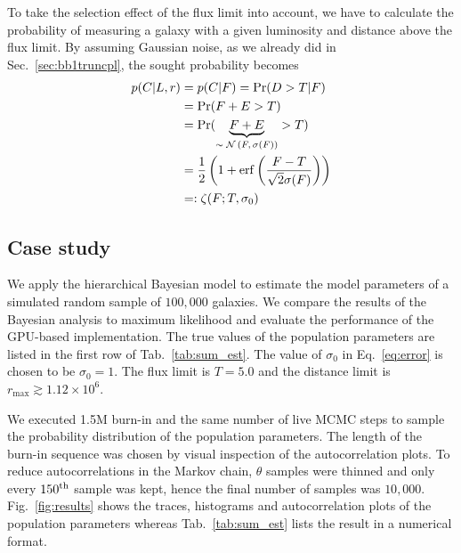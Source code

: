 To take the selection effect of the flux limit into account, we have to calculate the probability of measuring a galaxy with a given luminosity and distance above the flux limit.
By assuming Gaussian noise, as we already did in Sec.~\ref{sec:bb1truncpl}, the sought probability becomes
\begin{align}
p(C | L, r) &= p(C | F) = \Pr(D>T | F)\\
&= \Pr(F+E>T)\\
&=\Pr(\underbrace{F + E}_\text{$\sim \mathcal{N}\left(F,\sigma(F)\right)$} > T)\\
&=\frac{1}{2}\left( 1 + \operatorname{erf}\left( \frac{F - T}{\sqrt{2}\sigma(F)} \right) \right)\\
&=:\zeta(F ; T,\sigma_0)
\label{eq:pclr}
\end{align}



\subsection{Case study}


We apply the hierarchical Bayesian model to estimate the model parameters of a simulated random sample of $100{,}000$ galaxies.
We compare the results of the Bayesian analysis to maximum likelihood and evaluate the performance of the GPU-based implementation.
The true values of the population parameters are listed in the first row of Tab.~\ref{tab:sum_est}.
The value of $\sigma_0$ in Eq.~\ref{eq:error} is chosen to be $\sigma_0=1$.
The flux limit is $T = 5.0$ and the distance limit is $r_{\max} \gtrsim 1.12 \times 10^{6}$.

We executed 1.5M burn-in and the same number of live MCMC steps to sample the probability distribution of the population parameters.
The length of the burn-in sequence was chosen by visual inspection of the autocorrelation plots.
To reduce autocorrelations in the Markov chain, $\theta$ samples were thinned and only every $150^\textnormal{th}$ sample was kept, hence the final number of samples was $10{,}000$.
Fig.~\ref{fig:results} shows the traces, histograms and autocorrelation plots of the population parameters whereas Tab.~\ref{tab:sum_est} lists the result in a numerical format.

